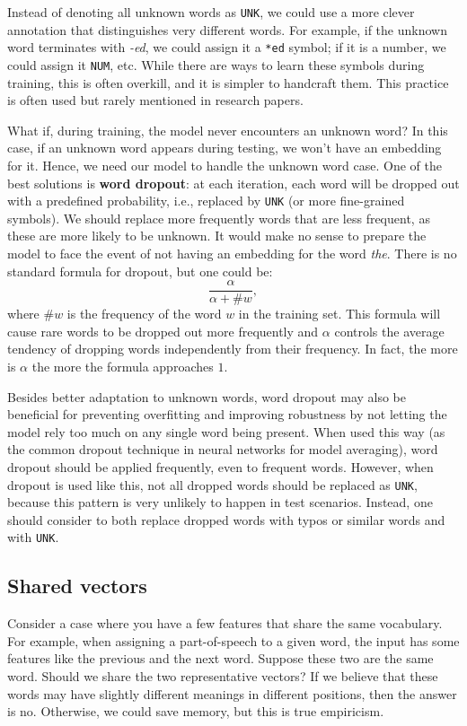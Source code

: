 Instead of denoting all unknown words as \texttt{UNK}, we could use a more clever annotation that distinguishes very different words. For example, if the unknown word terminates with \textit{-ed}, we could assign it a \texttt{*ed} symbol; if it is a number, we could assign it \texttt{NUM}, etc. While there are ways to learn these symbols during training, this is often overkill, and it is simpler to handcraft them. This practice is often used but rarely mentioned in research papers.

What if, during training, the model never encounters an unknown word? In this case, if an unknown word appears during testing, we won't have an embedding for it. Hence, we need our model to handle the unknown word case. One of the best solutions is \textbf{word dropout}: at each iteration, each word will be dropped out with a predefined probability, i.e., replaced by \texttt{UNK} (or more fine-grained symbols). We should replace more frequently words that are less frequent, as these are more likely to be unknown. It would make no sense to prepare the model to face the event of not having an embedding for the word \textit{the}. There is no standard formula for dropout, but one could be:
\[
\frac{\alpha}{\alpha + \#w},
\]
where \(\#w\) is the frequency of the word \(w\) in the training set. This formula will cause rare words to be dropped out more frequently and \(\alpha\) controls the average tendency of dropping words independently from their frequency.
In fact, the more is \(\alpha\) the more the formula approaches \(1\).

Besides better adaptation to unknown words, word dropout may also be beneficial for preventing overfitting and improving robustness by not letting the model rely too much on any single word being present. When used this way (as the common dropout technique in neural networks for model averaging), word dropout should be applied frequently, even to frequent words. 
However, when dropout is used like this, not all dropped words should be replaced as \texttt{UNK}, because this pattern is very unlikely to happen in test scenarios.
Instead, one should consider to both replace dropped words with typos or similar words and with \texttt{UNK}.

\subsection{Shared vectors}
Consider a case where you have a few features that share the same vocabulary. For example, when assigning a part-of-speech to a given word, the input has some features like the previous and the next word. Suppose these two are the same word. Should we share the two representative vectors? If we believe that these words may have slightly different meanings in different positions, then the answer is no. Otherwise, we could save memory, but this is true empiricism.

